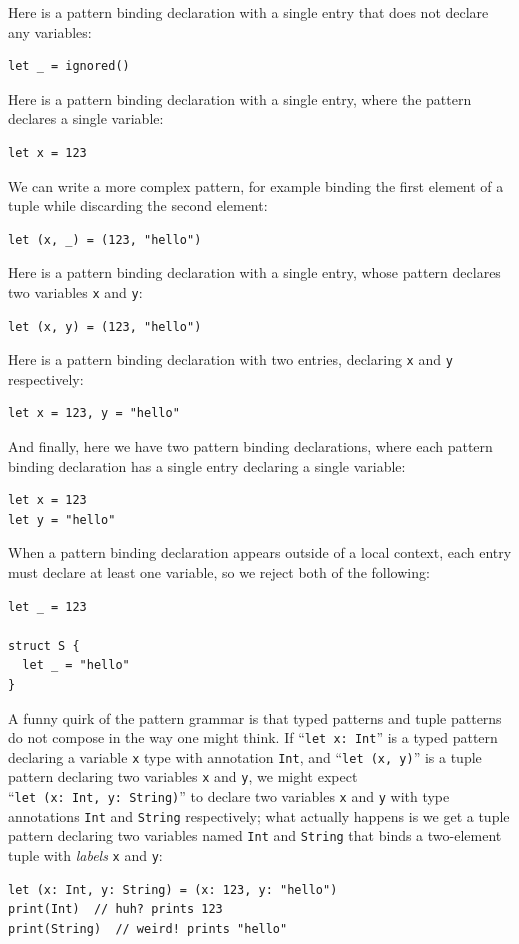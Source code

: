 \documentclass[../generics]{subfiles}
\begin{document}
Here is a pattern binding declaration with a single entry that does not declare any variables:
\begin{Verbatim}
let _ = ignored()
\end{Verbatim}
Here is a pattern binding declaration with a single entry, where the pattern declares a single variable:
\begin{Verbatim}
let x = 123
\end{Verbatim}
We can write a more complex pattern, for example binding the first element of a tuple while discarding the second element:
\begin{Verbatim}
let (x, _) = (123, "hello")
\end{Verbatim}
Here is a pattern binding declaration with a single entry, whose pattern declares two variables \texttt{x} and \texttt{y}:
\begin{Verbatim}
let (x, y) = (123, "hello")
\end{Verbatim}
Here is a pattern binding declaration with two entries, declaring \texttt{x} and \texttt{y} respectively:
\begin{Verbatim}
let x = 123, y = "hello"
\end{Verbatim}
And finally, here we have two pattern binding declarations, where each pattern binding declaration has a single entry declaring a single variable:
\begin{Verbatim}
let x = 123
let y = "hello"
\end{Verbatim}
When a pattern binding declaration appears outside of a local context, each entry must declare at least one variable, so we reject both of the following:
\begin{Verbatim}
let _ = 123

struct S {
  let _ = "hello"
}
\end{Verbatim}

A funny quirk of the pattern grammar is that typed patterns and tuple patterns do not compose in the way one might think. If ``\texttt{let x:~Int}'' is a typed pattern declaring a variable \texttt{x} type with annotation \texttt{Int}, and ``\texttt{let (x, y)}'' is a tuple pattern declaring two variables \texttt{x} and \texttt{y}, we might expect ``\texttt{let~(x:~Int,~y:~String)}'' to declare two variables \texttt{x} and \texttt{y} with type annotations \texttt{Int} and \texttt{String} respectively; what actually happens is we get a tuple pattern declaring two variables named \texttt{Int} and \texttt{String} that binds a two-element tuple with \emph{labels} \texttt{x} and \texttt{y}:
\begin{Verbatim}
let (x: Int, y: String) = (x: 123, y: "hello")
print(Int)  // huh? prints 123
print(String)  // weird! prints "hello"
\end{Verbatim}
\end{document}
